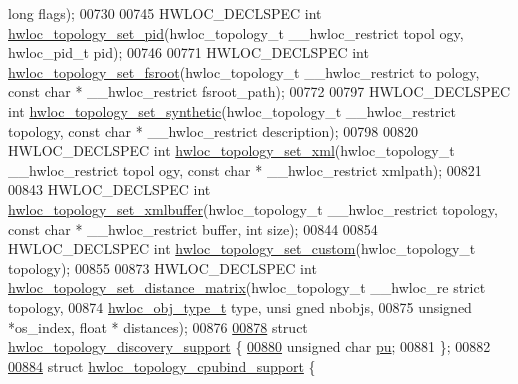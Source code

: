 \begin{DoxyCode}
      \textcolor{keywordtype}{long} flags);
00730 
00745 HWLOC\_DECLSPEC \textcolor{keywordtype}{int} \hyperlink{a00044_gae1100de0162b3c6a9db750ac14629c05}{hwloc_topology_set_pid}(hwloc\_topology\_t \_\_hwloc\_restrict topol
      ogy, hwloc\_pid\_t pid);
00746 
00771 HWLOC\_DECLSPEC \textcolor{keywordtype}{int} \hyperlink{a00044_ga2f6bfb6958d8b508ea1d7d5bb266432c}{hwloc_topology_set_fsroot}(hwloc\_topology\_t \_\_hwloc\_restrict to
      pology, \textcolor{keyword}{const} \textcolor{keywordtype}{char} * \_\_hwloc\_restrict fsroot\_path);
00772 
00797 HWLOC\_DECLSPEC \textcolor{keywordtype}{int} \hyperlink{a00044_ga2fcb52181b586c20f001b7a999550324}{hwloc_topology_set_synthetic}(hwloc\_topology\_t \_\_hwloc\_restrict
       topology, \textcolor{keyword}{const} \textcolor{keywordtype}{char} * \_\_hwloc\_restrict description);
00798 
00820 HWLOC\_DECLSPEC \textcolor{keywordtype}{int} \hyperlink{a00044_ga93efcc8a962afe1ed23393700682173f}{hwloc_topology_set_xml}(hwloc\_topology\_t \_\_hwloc\_restrict topol
      ogy, \textcolor{keyword}{const} \textcolor{keywordtype}{char} * \_\_hwloc\_restrict xmlpath);
00821 
00843 HWLOC\_DECLSPEC \textcolor{keywordtype}{int} \hyperlink{a00044_gae7e4bade144652a2b48f5eaf0309b4ec}{hwloc_topology_set_xmlbuffer}(hwloc\_topology\_t \_\_hwloc\_restrict
       topology, \textcolor{keyword}{const} \textcolor{keywordtype}{char} * \_\_hwloc\_restrict buffer, \textcolor{keywordtype}{int} size);
00844 
00854 HWLOC\_DECLSPEC \textcolor{keywordtype}{int} \hyperlink{a00044_ga12024fec46f9368fb8fc5c624089c5ec}{hwloc_topology_set_custom}(hwloc\_topology\_t topology);
00855 
00873 HWLOC\_DECLSPEC \textcolor{keywordtype}{int} \hyperlink{a00044_gabda6afa67a495cd652f064ad51d3fe47}{hwloc_topology_set_distance_matrix}(hwloc\_topology\_t \_\_hwloc\_re
      strict topology,
00874                                                       \hyperlink{a00041_gacd37bb612667dc437d66bfb175a8dc55}{hwloc_obj_type_t} type, \textcolor{keywordtype}{unsi
      gned} nbobjs,
00875                                                       \textcolor{keywordtype}{unsigned} *os\_index, \textcolor{keywordtype}{float} *
      distances);
00876 
\hypertarget{a00033_source_l00878}{}\hyperlink{a00024}{00878} \textcolor{keyword}{struct }\hyperlink{a00024}{hwloc_topology_discovery_support} \{
\hypertarget{a00033_source_l00880}{}\hyperlink{a00024_ad7bb4ecf7a82f5a04fc632e9592ad3ab}{00880}   \textcolor{keywordtype}{unsigned} \textcolor{keywordtype}{char} \hyperlink{a00024_ad7bb4ecf7a82f5a04fc632e9592ad3ab}{pu};
00881 \};
00882 
\hypertarget{a00033_source_l00884}{}\hyperlink{a00023}{00884} \textcolor{keyword}{struct }\hyperlink{a00023}{hwloc_topology_cpubind_support} \{

\end{DoxyCode}
